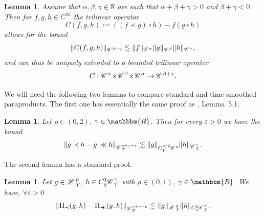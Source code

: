 \documentclass{amsart}
\newcommand{\assign}{:=}
\newcommand{\precprec}{\prec\!\!\!\prec}
\newtheorem{lemma}[theorem]{Lemma}
\theoremstyle{remark}
\theoremstyle{definition}
\newcommand{\CC}{\mathscr{C} \hspace{.1em}}
\newcommand{\LL}{\mathscr{L} \hspace{.2em}}
\begin{document}
\begin{lemma}
  \label{lem:commutator} Assume that $\alpha, \beta, \gamma \in \mathbb{R}$
  are such that $\alpha + \beta + \gamma > 0$ and $\beta + \gamma < 0$. Then
  for $f, g, h \in C^{\infty}$ the trilinear operator
  \[ C (f, g, h) \assign ((f \prec g) \circ h) - f (g \circ h) \]
  allows for the bound
  \begin{equation}
    \label{eq:commutator bound} \|C (f, g, h)\|_{\CC^{\beta + \gamma}}
    \lesssim \|f\|_{\CC^{\alpha}} \|g\|_{\CC^{\beta}} \|h\|_{\CC^{\gamma}},
  \end{equation}
  and can thus be uniquely extended to a bounded trilinear operator
  \[ C : \CC^{\alpha} \hspace{-0.17em} \times \hspace{-0.17em} \CC^{\beta}
     \hspace{-0.17em} \times \hspace{-0.17em} \CC^{\alpha} \rightarrow
     \CC^{\beta + \gamma} . \]
\end{lemma}

We will need the following two lemmas to compare standard and time-smoothed
paraproducts. The first one has essentially the same proof as
{\cite{gubinelli_paracontrolled_2015}}, Lemma~5.1.

\begin{lemma}
  \label{l:comm-paraproduct} Let $\rho \in (0, 2)$, $\gamma \in \mathbbm{R}$.
  Then for every $\varepsilon > 0$ we have the bound
  \[ \| g \prec h - g \precprec h \|_{\CC^{\rho + \gamma - \varepsilon}_T}
     \lesssim \| g \|_{C_T^{\rho / 2} \CC^0} \| h \|_{\CC^{\gamma}_T} . \]
\end{lemma}

The second lemma has a standard proof.

\begin{lemma}
  \label{l:comm-nonlin-para}Let $g \in \LL^{\rho}_T$, $h \in C_{\eta}^1
  \CC^{\gamma}_T$ with $\rho \in (0, 1)$, $\gamma \in \mathbbm{R}$. We have,
  $\forall \varepsilon > 0$
  \[ \| \Pi_{\prec} (g, h) - \Pi_{\precprec} (g, h) \|_{\CC^{\rho + \gamma -
     \varepsilon}_T} \lesssim \| g \|_{\LL^{\rho}_T} \| h \|_{C_{\eta}^1
     \CC^{\gamma}_T} . \]
\end{lemma}
\end{document}
